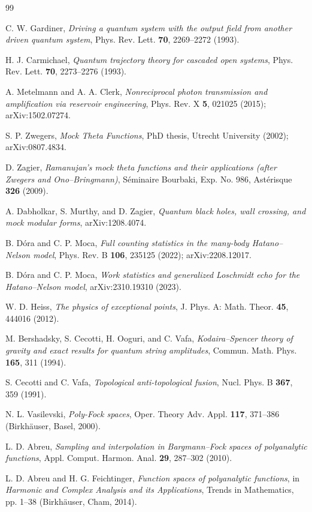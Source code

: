 \documentclass[11pt,a4paper]{article}
\begin{document}
\begin{thebibliography}{99}

C. W. Gardiner,
\emph{Driving a quantum system with the output field from another driven quantum system},
Phys. Rev. Lett. \textbf{70}, 2269--2272 (1993).

H. J. Carmichael,
\emph{Quantum trajectory theory for cascaded open systems},
Phys. Rev. Lett. \textbf{70}, 2273--2276 (1993).

A. Metelmann and A. A. Clerk,
\emph{Nonreciprocal photon transmission and amplification via reservoir engineering},
Phys. Rev. X \textbf{5}, 021025 (2015); arXiv:1502.07274.

S. P. Zwegers,
\emph{Mock Theta Functions},
PhD thesis, Utrecht University (2002); arXiv:0807.4834.

D. Zagier,
\emph{Ramanujan's mock theta functions and their applications (after Zwegers and Ono--Bringmann)},
S\'eminaire Bourbaki, Exp. No. 986, Ast\'erisque \textbf{326} (2009).

A. Dabholkar, S. Murthy, and D. Zagier,
\emph{Quantum black holes, wall crossing, and mock modular forms},
arXiv:1208.4074.

B. D\'ora and C. P. Moca,
\emph{Full counting statistics in the many-body Hatano--Nelson model},
Phys. Rev. B \textbf{106}, 235125 (2022); arXiv:2208.12017.

B. D\'ora and C. P. Moca,
\emph{Work statistics and generalized Loschmidt echo for the Hatano--Nelson model},
arXiv:2310.19310 (2023).

W. D. Heiss,
\emph{The physics of exceptional points},
J. Phys. A: Math. Theor. \textbf{45}, 444016 (2012).

M. Bershadsky, S. Cecotti, H. Ooguri, and C. Vafa,
\emph{Kodaira--Spencer theory of gravity and exact results for quantum string amplitudes},
Commun. Math. Phys. \textbf{165}, 311 (1994).

S. Cecotti and C. Vafa,
\emph{Topological anti-topological fusion},
Nucl. Phys. B \textbf{367}, 359 (1991).

N. L. Vasilevski,
\emph{Poly-Fock spaces},
Oper. Theory Adv. Appl. \textbf{117}, 371--386 (Birkh\"auser, Basel, 2000).

L. D. Abreu,
\emph{Sampling and interpolation in Bargmann--Fock spaces of polyanalytic functions},
Appl. Comput. Harmon. Anal. \textbf{29}, 287--302 (2010).

L. D. Abreu and H. G. Feichtinger,
\emph{Function spaces of polyanalytic functions},
in \emph{Harmonic and Complex Analysis and its Applications}, Trends in Mathematics,
pp. 1--38 (Birkh\"auser, Cham, 2014).

\end{thebibliography}
\end{document}
